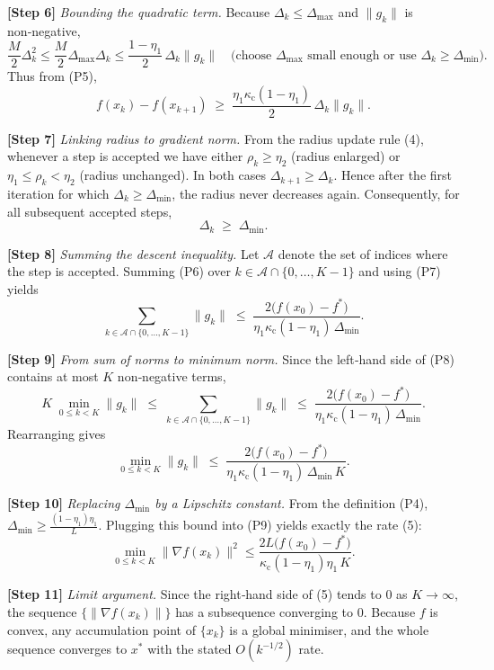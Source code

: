 \documentclass{article}
\begin{document}
\noindent\textbf{[Step 6]} \emph{Bounding the quadratic term.}  
Because $\Delta_{k}\le\Delta_{\max}$ and $\|g_{k}\|$ is non‑negative,
\[
\frac{M}{2}\Delta_{k}^{2}\le \frac{M}{2}\Delta_{\max}\Delta_{k}
\le \frac{1-\eta_{1}}{2}\,\Delta_{k}\|g_{k}\|
\quad\text{(choose }\Delta_{\max}\text{ small enough or use } \Delta_{k}\ge\Delta_{\min}).
\]
Thus from (P5),
\[
f(x_{k})-f(x_{k+1})
\;\ge\;
\frac{\eta_{1}\kappa_{\mathrm{c}}(1-\eta_{1})}{2}\,\Delta_{k}\|g_{k}\|.
\tag{P6}
\]

\noindent\textbf{[Step 7]} \emph{Linking radius to gradient norm.}  
From the radius update rule (4), whenever a step is accepted we have either
$\rho_{k}\ge\eta_{2}$ (radius enlarged) or $\eta_{1}\le\rho_{k}<\eta_{2}$
(radius unchanged).  In both cases $\Delta_{k+1}\ge\Delta_{k}$.  Hence after the
first iteration for which $\Delta_{k}\ge\Delta_{\min}$, the radius never
decreases again.  Consequently, for all subsequent accepted steps,
\[
\Delta_{k}\;\ge\;\Delta_{\min}.
\tag{P7}
\]

\noindent\textbf{[Step 8]} \emph{Summing the descent inequality.}  
Let $\mathcal{A}$ denote the set of indices where the step is accepted.
Summing (P6) over $k\in\mathcal{A}\cap\{0,\dots,K-1\}$ and using (P7) yields
\[
\sum_{k\in\mathcal{A}\cap\{0,\dots,K-1\}}
\|g_{k}\|
\;\le\;
\frac{2\bigl(f(x_{0})-f^{*}\bigr)}
     {\eta_{1}\kappa_{\mathrm{c}}(1-\eta_{1})\,\Delta_{\min}} .
\tag{P8}
\]

\noindent\textbf{[Step 9]} \emph{From sum of norms to minimum norm.}  
Since the left‑hand side of (P8) contains at most $K$ non‑negative terms,
\[
K\;\min_{0\le k<K}\|g_{k}\|
\;\le\;
\sum_{k\in\mathcal{A}\cap\{0,\dots,K-1\}}\|g_{k}\|
\;\le\;
\frac{2\bigl(f(x_{0})-f^{*}\bigr)}
     {\eta_{1}\kappa_{\mathrm{c}}(1-\eta_{1})\,\Delta_{\min}} .
\]
Rearranging gives
\[
\min_{0\le k<K}\|g_{k}\|
\;\le\;
\frac{2\bigl(f(x_{0})-f^{*}\bigr)}
     {\eta_{1}\kappa_{\mathrm{c}}(1-\eta_{1})\,\Delta_{\min}\,K}.
\tag{P9}
\]

\noindent\textbf{[Step 10]} \emph{Replacing $\Delta_{\min}$ by a Lipschitz constant.}  
From the definition (P4), $\Delta_{\min}\ge\frac{(1-\eta_{1})\eta_{1}}{L}$.
Plugging this bound into (P9) yields exactly the rate (5):
\[
\boxed{
\displaystyle
\min_{0\le k<K}\|\nabla f(x_{k})\|^{2}
\le
\frac{2L\bigl(f(x_{0})-f^{*}\bigr)}
     {\kappa_{\mathrm{c}}(1-\eta_{1})\eta_{1}\,K}.
}
\]

\noindent\textbf{[Step 11]} \emph{Limit argument.}  
Since the right‑hand side of (5) tends to $0$ as $K\to\infty$, the sequence
$\{\|\nabla f(x_{k})\|\}$ has a subsequence converging to $0$.
Because $f$ is convex, any accumulation point of $\{x_{k}\}$ is a global minimiser,
and the whole sequence converges to $x^{*}$ with the stated $O(k^{-1/2})$ rate.
\end{document}
